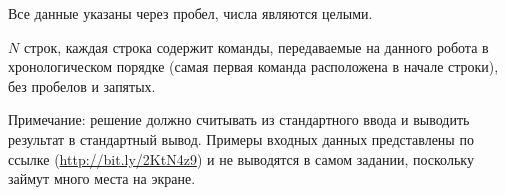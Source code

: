 Все данные указаны через пробел, числа являются целыми.

\outputfmtSection

$N$ строк, каждая строка содержит команды, передаваемые на данного робота в хронологическом порядке (самая первая команда расположена в начале строки), без пробелов и запятых.

Примечание: решение должно считывать из стандартного ввода и выводить результат в стандартный вывод. 
Примеры входных данных представлены по ссылке (\url{http://bit.ly/2KtN4z9}) и не выводятся в самом задании, поскольку займут много места на экране.

